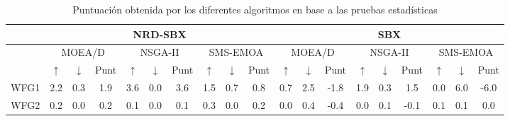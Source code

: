 \begin{table}[t]
\centering
\scriptsize
\caption{Puntuación obtenida por los diferentes algoritmos en base a las pruebas estadísticas}
\label{Tab:HV-score}
\begin{tabular}{c|c|c|c|c|c|c|c|c|c|ccccccccc}
\cline{2-19}
                            & \multicolumn{9}{c|}{NRD-SBX}                                                                                    & \multicolumn{9}{c}{SBX}                                                                                                                                                                                                                                                                                      \\ \hline
\multicolumn{1}{|c|}{}      & \multicolumn{3}{c|}{MOEA/D}         & \multicolumn{3}{c|}{NSGA-II}        & \multicolumn{3}{c|}{SMS-EMOA}       & \multicolumn{3}{c|}{MOEA/D}                                                                        & \multicolumn{3}{c|}{NSGA-II}                                                                       & \multicolumn{3}{c|}{SMS-EMOA}                                                                      \\ \hline
\multicolumn{1}{|c|}{}      & $\uparrow$   & $\downarrow$ & Punt & $\uparrow$   & $\downarrow$ & Punt & $\uparrow$   & $\downarrow$ & Punt & \multicolumn{1}{c|}{$\uparrow$}   & \multicolumn{1}{c|}{$\downarrow$} & \multicolumn{1}{c|}{Punt} & \multicolumn{1}{c|}{$\uparrow$}   & \multicolumn{1}{c|}{$\downarrow$} & \multicolumn{1}{c|}{Punt} & \multicolumn{1}{c|}{$\uparrow$}   & \multicolumn{1}{c|}{$\downarrow$} & \multicolumn{1}{c|}{Punt} \\ \hline
\multicolumn{1}{|c|}{WFG1}  & 2.2          & 0.3          & 1.9   & 3.6          & 0.0          & 3.6   & 1.5          & 0.7          & 0.8   & \multicolumn{1}{c|}{0.7}          & \multicolumn{1}{c|}{2.5}          & \multicolumn{1}{c|}{-1.8}  & \multicolumn{1}{c|}{1.9}          & \multicolumn{1}{c|}{0.3}          & \multicolumn{1}{c|}{1.5}   & \multicolumn{1}{c|}{0.0}          & \multicolumn{1}{c|}{6.0}          & \multicolumn{1}{c|}{-6.0}  \\ \hline
\multicolumn{1}{|c|}{WFG2}  & 0.2          & 0.0          & 0.2   & 0.1          & 0.0          & 0.1   & 0.3          & 0.0          & 0.2   & \multicolumn{1}{c|}{0.0}          & \multicolumn{1}{c|}{0.4}          & \multicolumn{1}{c|}{-0.4}  & \multicolumn{1}{c|}{0.0}          & \multicolumn{1}{c|}{0.1}          & \multicolumn{1}{c|}{-0.1}  & \multicolumn{1}{c|}{0.1}          & \multicolumn{1}{c|}{0.1}          & \multicolumn{1}{c|}{0.0}   \\ \hline

\end{tabular}
\end{table}
